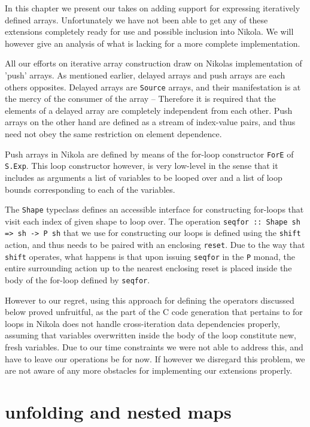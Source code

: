 \label{chap:unfold}

In this chapter we present our takes on adding support for expressing
iteratively defined arrays.  Unfortunately we have not been able to get any of
these extensions completely ready for use and possible inclusion into Nikola.
We will however give an analysis of what is lacking for a more complete
implementation.

All our efforts on iterative array construction draw on Nikolas implementation
of 'push' arrays. As mentioned earlier, delayed arrays and push arrays are each
others opposites. Delayed arrays are \texttt{Source} arrays, and their
manifestation is at the mercy of the consumer of the array -- Therefore it is
required that the elements of a delayed array are completely independent from
each other.  Push arrays on the other hand are defined as a stream of
index-value pairs, and thus need not obey the same restriction on element
dependence.

Push arrays in Nikola are defined by means of the for-loop constructor \texttt{ForE}
of \texttt{S.Exp}. This loop constructor however, is very low-level in the
sense that it includes as arguments a list of variables to be looped over and a
list of loop bounds corresponding to each of the variables.

The \texttt{Shape} typeclass defines an accessible interface for constructing
for-loops that visit each index of given shape to loop over.  The operation
\texttt{seqfor :: Shape sh => sh -> P sh} that we use for constructing our
loops is defined using the \texttt{shift} action, and thus needs to be paired
with an enclosing \texttt{reset}.  Due to the way that \texttt{shift} operates,
what happens is that upon issuing \texttt{seqfor} in the \texttt{P} monad, the
entire surrounding action up to the nearest enclosing reset is placed inside
the body of the for-loop defined by \texttt{seqfor}.

However to our regret, using this approach for defining the operators discussed
below proved unfruitful, as the part of the C code generation that pertains to
for loops in Nikola does not handle cross-iteration data dependencies properly,
assuming that variables overwritten inside the body of the loop constitute new,
fresh variables. Due to our time constraints we were not able to address this,
and have to leave our operations be for now. If however we disregard this
problem, we are not aware of any more obstacles for implementing our extensions
properly.

\section{unfolding and nested maps}

